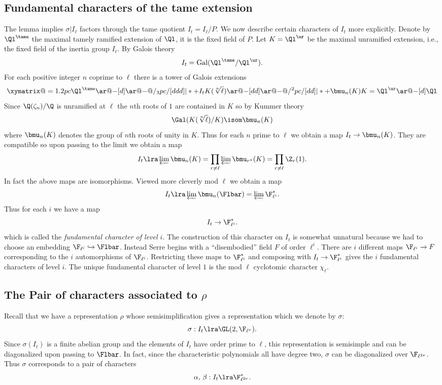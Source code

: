 \documentclass{report}
\begin{document}
\subsection{Fundamental characters of the tame extension}

The lemma implies $\sigma|I_{\ell}$ factors through the tame quotient
$I_t=I_{\ell}/P$.  We now describe certain characters of
$I_t$ more explicitly.   Denote by
$\Ql^{\tame}$ the maximal tamely ramified extension of
$\Ql$, it is the fixed field of $P$.
Let $K=\Ql^{\ur}$ be the maximal unramified extension, i.e.,
the fixed field of the inertia group $I_{\ell}$.
By Galois theory
    $$I_t=\mbox{\rm Gal}(\Ql^{\tame}/\Ql^{\ur}).$$
For each positive integer $n$ coprime to $\ell$ there is a
tower of Galois extensions
$$\xymatrix@=1.2pc{
{\Ql^{\tame}}\ar@{-}[d] \ar@{-}@/_3pc/[ddd]|*+{I_t}\\
{K(\protect{\sqrt[n]{\ell}})}\ar@{-}[dd]\ar@{-}@/^2pc/[dd]|*+{\bmu_n(K)}\\
\\
{K=\Ql^{\ur}}\ar@{-}[d]\\
{\Ql}}$$
Since $\Q(\zeta_n)/\Q$ is unramified at $\ell$
the $n$th roots of $1$ are contained in $K$ so by
Kummer theory
 $$\Gal(K(\sqrt[n]{\ell})/K)\isom \bmu_n(K)$$
where $\bmu_n(K)$ denotes the group of $n$th roots of unity in $K$.
Thus for each $n$ prime to $\ell$ we obtain a map
$I_t\rightarrow\bmu_n(K)$.
They are compatible so upon passing to the limit we obtain a map
$$I_t\lra \varprojlim \bmu_n(K)
        =\prod_{r\neq \ell}\varprojlim\bmu_{r^a}(K)
        =\prod_{r\neq \ell}\Z_r(1).$$
In fact \cite[8, Corollary 3]{frohlich:local} the above
maps are isomorphisms.
Viewed more cleverly mod $\ell$ we obtain a map
$$I_t\lra \varprojlim \bmu_n(\Flbar)
      = \varprojlim \F_{\ell^i}^*.$$
Thus for each $i$ we have a map
       $$I_t\rightarrow\F_{\ell^i}^*.$$
which is called the {\em fundamental character of level $i$}.
The construction of this character on $I_t$
is somewhat unnatural because we had to choose an embedding
$\F_{\ell^i}\hookrightarrow \Flbar$. Instead Serre
begins with a  ``disembodied'' field $F$ of order $\ell^i$.
There are $i$ different maps $\F_{\ell^i}\rightarrow F$ corresponding to the
$i$ automorphisms of $\F_{\ell^i}$. Restricting these maps to $\F_{\ell^i}^*$
and composing with $I_t\rightarrow\F_{\ell^i}^*$
gives the $i$ fundamental characters of level $i$.
The unique fundamental character of level $1$ is
the mod $\ell$ cyclotomic character $\chi_{\ell}$.


\subsection{The Pair of characters associated to $\rho$}
Recall that we have a representation $\rho$ whose semisimplification
gives a representation which we
denote by $\sigma$:
   $$\sigma:I_t\lra \GL(2,\F_{\ell^{\nu}}).$$
Since $\sigma(I_t)$ is a finite abelian group and
the elements of $I_t$ have order prime to $\ell$,
this representation is semisimple and can be
diagonalized upon passing to $\Flbar$.  In fact,
since the characteristic polynomials all have degree
two, $\sigma$ can be diagonalized over $\F_{\ell^{2\nu}}$.
Thus $\sigma$ corresponds to a pair of characters
$$\alpha,\,\beta:I_t\lra\F_{\ell^{2\nu}}^*.$$
\end{document}
